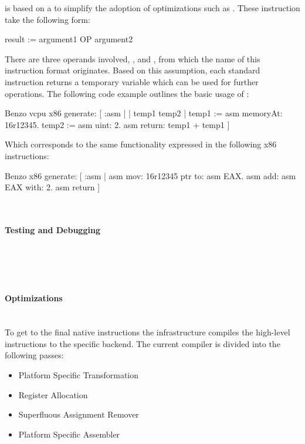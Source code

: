 \VCPU is based on a \TAC to simplify the adoption of optimizations such as \SSA.
These \TAC instruction take the following form:
%
\begin{stcode}{}
result := argument1 OP argument2
\end{stcode}
%
There are three operands involved, ,  and , from which the name of this instruction format originates.
Based on this assumption, each standard \VCPU instruction returns a temporary variable which can be used for further operations.
The following code example outlines the basic usage of \VCPU:
%
\begin{stcode}[
	label={lst:benzo-problem-vcpu}, 
	caption={Basic \VCPU Example}
]{}
Benzo vcpu x86 generate: [ :asm | | temp1 temp2 |
	temp1 := asm memoryAt: 16r12345.
	temp2 := asm uint: 2.
	asm return: temp1 + temp1 ]
\end{stcode}
%
Which corresponds to the same functionality expressed in the following x86 instructions:
%
\begin{stcode}{}
Benzo x86 generate: [ :asm |
	asm mov: 16r12345 ptr to: asm EAX.
	asm add: asm EAX with: 2.
	asm return ]
\end{stcode}

 \\

\paragraph{\VCPU Testing and Debugging}
 \\
 \\
 \\


\paragraph{\VCPU Optimizations}
 \\

To get to the final native instructions the \VCPU infrastructure compiles the high-level instructions to the specific backend.
The current compiler is divided into the following passes:
%
\begin{itemize}[noitemsep]
\item Platform Specific Transformation
\item Register Allocation
\item Superfluous Assignment Remover
\item Platform Specific Assembler
\end{itemize}




